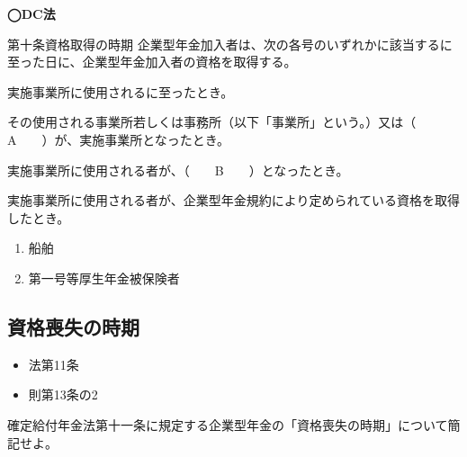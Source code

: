 \begin{fillblank}[自作 2026/10/17]
    \noindent \textbf{◯DC法}
  \begin{lawstructure}
    \begin{lawarticle}{第十条}{資格取得の時期}
      企業型年金加入者は、次の各号のいずれかに該当するに至った日に、企業型年金加入者の資格を取得する。

      実施事業所に使用されるに至ったとき。

      その使用される事業所若しくは事務所（以下「事業所」という。）又は（　　A　　）が、実施事業所となったとき。

      実施事業所に使用される者が、（　　B　　）となったとき。

      実施事業所に使用される者が、企業型年金規約により定められている資格を取得したとき。
    \end{lawarticle}
  \end{lawstructure}
\end{fillblank}

\begin{answerbox}
  \begin{enumerate}[A:]
    \item 船舶
    \item 第一号等厚生年金被保険者
  \end{enumerate}
\end{answerbox}

\newpage


\subsection{資格喪失の時期}

\begin{InyouJobunbox}
  \begin{itemize}
    \item 法第11条
    \item 則第13条の2
  \end{itemize}
\end{InyouJobunbox}


\begin{shortanswer}[数理人試験 H30 問題2B 設問2]
  確定給付年金法第十一条に規定する企業型年金の「資格喪失の時期」について簡記せよ。
\end{shortanswer}


